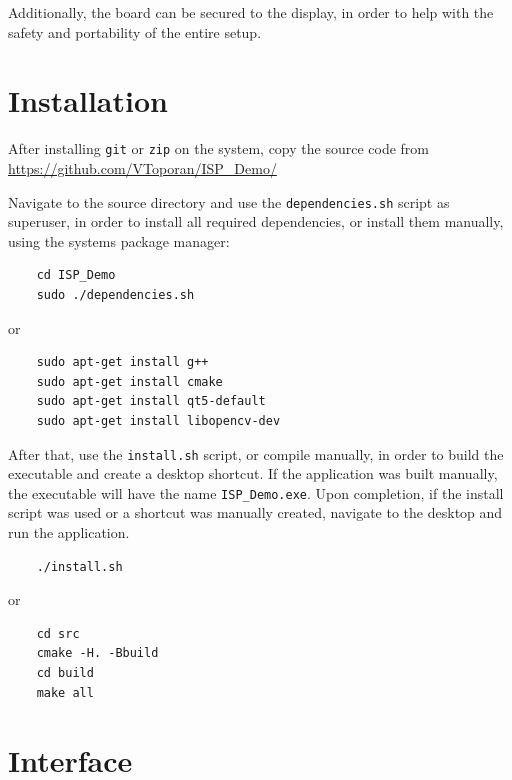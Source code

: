 Additionally, the board can be secured to the display, in order to help with the safety and portability of the
entire setup.

\section{Installation}

After installing \verb|git| or \verb|zip| on the system, copy the source code from
\url{https://github.com/VToporan/ISP_Demo/}

Navigate to the source directory and use the \verb|dependencies.sh| script as superuser, in order to install
all required dependencies, or install them manually, using the systems package manager:
\begin{code}
	\begin{lstlisting}
    cd ISP_Demo
    sudo ./dependencies.sh
    \end{lstlisting}
	or
	\begin{lstlisting}
    sudo apt-get install g++
    sudo apt-get install cmake
    sudo apt-get install qt5-default
    sudo apt-get install libopencv-dev
    \end{lstlisting}
\end{code}

After that, use the \verb|install.sh| script, or compile manually, in order to build the executable and create
a desktop shortcut. If the application was built manually, the executable will have the name \verb|ISP_Demo.exe|.
Upon completion, if the install script was used or a shortcut was manually created, navigate to the desktop and
run the application.

\begin{code}
	\begin{lstlisting}
    ./install.sh
    \end{lstlisting}
	or
	\begin{lstlisting}
    cd src
    cmake -H. -Bbuild
    cd build
    make all
    \end{lstlisting}
\end{code}

\pagebreak
\section{Interface}

